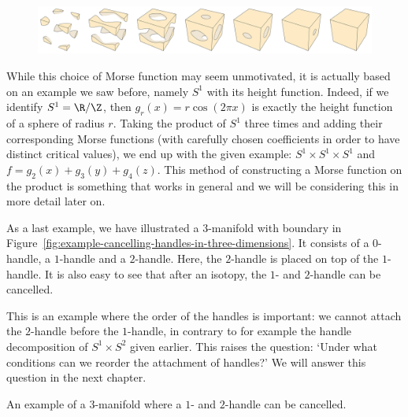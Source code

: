 \begin{eg}[$T^{3} = S^{1} \times S^{1} \times S^{1}$]
    \begin{figure}[H]
    \centering
    \includegraphics[width=0.90\paperwidth]{./notebooks/three-torus/output.png}
    \label{fig:three-torus-handle-decomposition}
\end{figure}
While this choice of Morse function may seem unmotivated, it is actually based on an example we saw before, namely $S^{1}$ with its height function.
Indeed, if we identify $S^{1} = \R / \Z$, then $g_r(x) = r\cos(2 \pi x)$ is exactly the height function of a sphere of radius $r$.
Taking the product of $S^{1}$ three times and adding their corresponding Morse functions (with carefully chosen coefficients in order to have distinct critical values), we end up with the given example: $S^{1}\times S^{1} \times S^{1}$ and $f = g_2(x) + g_3(y) + g_4(z)$.
This method of constructing a Morse function on the product is something that works in general and we will be considering this in more detail later on.

\end{eg}

\begin{eg}
    As a last example, we have illustrated a $3$-manifold with boundary in Figure~\ref{fig:example-cancelling-handles-in-three-dimensions}.
    It consists of a $0$-handle, a $1$-handle and a $2$-handle.
    Here, the $2$-handle is placed on top of the $1$-handle.
    It is also easy to see that after an isotopy, the $1$- and $2$-handle can be cancelled.

    This is an example where the order of the handles is important: we cannot attach the $2$-handle before the $1$-handle, in contrary to for example the handle decomposition of $ S^1 \times S^2$ given earlier.
    This raises the question: `Under what conditions can we reorder the attachment of handles?' We will answer this question in the next chapter.

    \begin{marginfigure}
    \centering
    \caption{An example of a $3$-manifold where a $1$- and $2$-handle can be cancelled.}
    \label{fig:example-cancelling-handles-in-three-dimensions}
\end{marginfigure}
\end{eg}





